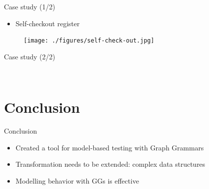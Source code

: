 \documentclass{FMTslides}
\begin{document}
\begin{frame}{Case study (1/2)}
  \begin{itemize}
  \item Self-checkout register
\end{itemize}
\begin{figure}
\centering\texttt{[image: ./figures/self-check-out.jpg]}
\end{figure}
\end{frame}

\begin{frame}{Case study (2/2)}
\begin{figure}
\centering
    \hspace{10px}
    \\
    \hspace{10px}
\end{figure}
\end{frame}

\section[Conclusion]{Conclusion}

\begin{frame}{Conclusion}
  \begin{itemize}
    \item Created a tool for model-based testing with Graph Grammars
    \item Transformation needs to be extended: complex data structures
    \item Modelling behavior with GGs is effective
  \end{itemize}
\end{frame}
\end{document}

